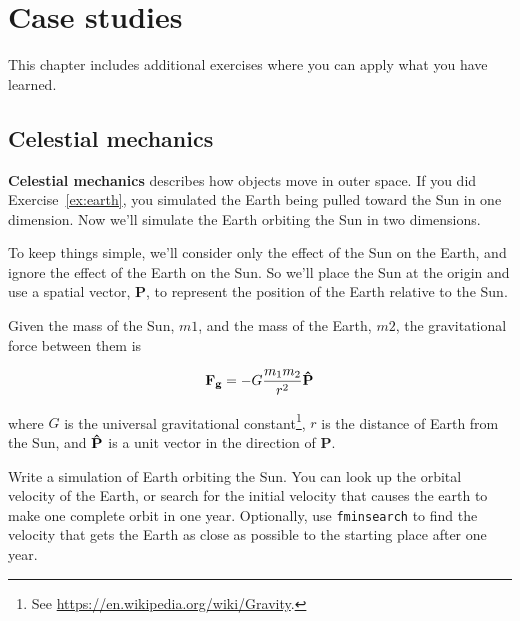 \documentclass[
]{book}
\numberwithin{Answer}{chapter}
\numberwithin{Exercise}{chapter}
\renewcommand{\vec}[1]{\bm{\mathbf{#1}}}
\newcommand{\uveci}{{\bm{\hat{\textnormal{\bfseries\i}}}}}
\newcommand{\uvecj}{{\bm{\hat{\textnormal{\bfseries\j}}}}}
\newcommand{\uvec}[1]{%
    \ifthenelse{\equal{#1}{i}}%
        {\uveci}{%
    \ifthenelse{\equal{#1}{j}}%
        {\uvecj}{%
    {\bm{\hat{\mathbf{#1}}}}%
}}}
\begin{document}
\chapter{Case studies}

This chapter includes additional exercises where you can apply what you have learned.

\section{Celestial mechanics}


{\bf Celestial mechanics} describes how objects move in outer space.
If you did Exercise~\ref{ex:earth}, you simulated the Earth being pulled toward the Sun in one dimension.  Now we'll simulate the Earth orbiting the Sun in two dimensions.


To keep things simple, we'll consider only the effect of the Sun on the Earth, and ignore the effect of the Earth on the Sun.  So we'll place the Sun at the origin and use a spatial vector, $\vec{P}$, to represent the position of the Earth relative to the Sun.


Given the mass of the Sun, $m1$, and the mass of the Earth, $m2$, the gravitational force between them is

\begin{equation*}
\vec{F_g} = -G \frac{m_1 m_2}{r^2} \uvec{P}
\end{equation*}

where $G$ is the universal gravitational constant\footnote{See \url{https://en.wikipedia.org/wiki/Gravity}.},
$r$ is the distance of Earth from the Sun, and
$\uvec{P}$ is a unit vector in the direction of $\vec{P}$.


Write a simulation of Earth orbiting the Sun.  You can look up the orbital velocity of the Earth, or search for the initial velocity that causes the earth to make one complete orbit in one year.  Optionally, use {\tt fminsearch} to find the velocity that gets the Earth as close as possible to the starting place after one year.

\end{document}
